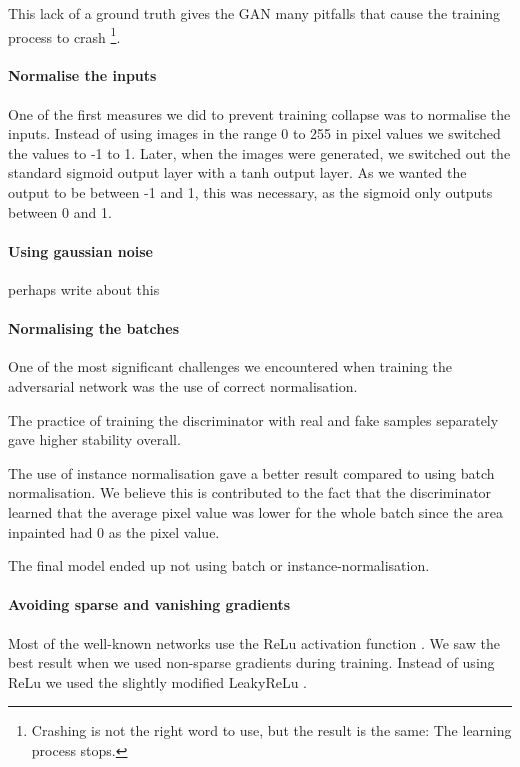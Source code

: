 This lack of a ground truth gives the GAN many pitfalls that cause the training process to crash \footnote{Crashing is not the right word to use, but the result is the same: The learning process stops.}.


\paragraph{Normalise the inputs}
One of the first measures we did to prevent training collapse was to normalise the inputs. Instead of using images in the range 0 to 255 in pixel values we switched the values to  -1 to 1. 
Later, when the images were generated, we switched out the standard sigmoid output layer with a tanh output layer. As we wanted the output to be between -1 and 1, this was necessary, as the sigmoid only outputs between 0 and 1.

\paragraph{Using gaussian noise}
perhaps write about this



\paragraph{Normalising the batches}
One of the most significant challenges we encountered when training the adversarial network was the use of correct normalisation. 

The practice of training the discriminator with real and fake samples separately gave higher stability overall. 

The use of instance normalisation gave a better result compared to using batch normalisation. We believe this is contributed to the fact that the discriminator learned that the average pixel value was lower for the whole batch since the area inpainted had 0 as the pixel value.

The final model ended up not using batch or instance-normalisation. 



\paragraph{Avoiding sparse and vanishing gradients}
Most of the well-known networks use the ReLu\cite{Nair/2010/RLU/3104322.3104425} activation function \cite{DBLP:journals/corr/SimonyanZ14a} \cite{DBLP:journals/corr/SzegedyIV16} 
\cite{DBLP:journals/corr/HeZRS15}.
We saw the best result when we used non-sparse gradients during training. 
Instead of using ReLu we used the slightly modified LeakyReLu \cite{Maas2013RectifierNI}.

